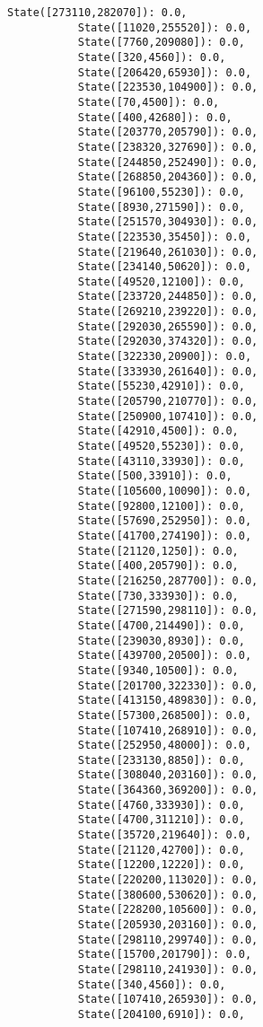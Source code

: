 \documentclass[11pt]{article}
\begin{document}
\begin{Verbatim}[commandchars=\\\{\}]
           State([273110,282070]): 0.0,
           State([11020,255520]): 0.0,
           State([7760,209080]): 0.0,
           State([320,4560]): 0.0,
           State([206420,65930]): 0.0,
           State([223530,104900]): 0.0,
           State([70,4500]): 0.0,
           State([400,42680]): 0.0,
           State([203770,205790]): 0.0,
           State([238320,327690]): 0.0,
           State([244850,252490]): 0.0,
           State([268850,204360]): 0.0,
           State([96100,55230]): 0.0,
           State([8930,271590]): 0.0,
           State([251570,304930]): 0.0,
           State([223530,35450]): 0.0,
           State([219640,261030]): 0.0,
           State([234140,50620]): 0.0,
           State([49520,12100]): 0.0,
           State([233720,244850]): 0.0,
           State([269210,239220]): 0.0,
           State([292030,265590]): 0.0,
           State([292030,374320]): 0.0,
           State([322330,20900]): 0.0,
           State([333930,261640]): 0.0,
           State([55230,42910]): 0.0,
           State([205790,210770]): 0.0,
           State([250900,107410]): 0.0,
           State([42910,4500]): 0.0,
           State([49520,55230]): 0.0,
           State([43110,33930]): 0.0,
           State([500,33910]): 0.0,
           State([105600,10090]): 0.0,
           State([92800,12100]): 0.0,
           State([57690,252950]): 0.0,
           State([41700,274190]): 0.0,
           State([21120,1250]): 0.0,
           State([400,205790]): 0.0,
           State([216250,287700]): 0.0,
           State([730,333930]): 0.0,
           State([271590,298110]): 0.0,
           State([4700,214490]): 0.0,
           State([239030,8930]): 0.0,
           State([439700,20500]): 0.0,
           State([9340,10500]): 0.0,
           State([201700,322330]): 0.0,
           State([413150,489830]): 0.0,
           State([57300,268500]): 0.0,
           State([107410,268910]): 0.0,
           State([252950,48000]): 0.0,
           State([233130,8850]): 0.0,
           State([308040,203160]): 0.0,
           State([364360,369200]): 0.0,
           State([4760,333930]): 0.0,
           State([4700,311210]): 0.0,
           State([35720,219640]): 0.0,
           State([21120,42700]): 0.0,
           State([12200,12220]): 0.0,
           State([220200,113020]): 0.0,
           State([380600,530620]): 0.0,
           State([228200,105600]): 0.0,
           State([205930,203160]): 0.0,
           State([298110,299740]): 0.0,
           State([15700,201790]): 0.0,
           State([298110,241930]): 0.0,
           State([340,4560]): 0.0,
           State([107410,265930]): 0.0,
           State([204100,6910]): 0.0,

\end{Verbatim}
\end{document}
